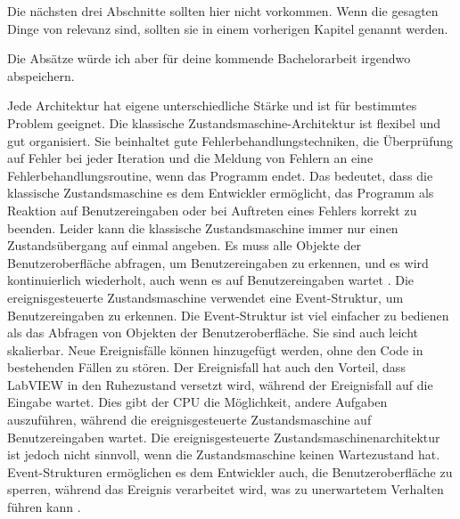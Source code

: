 \iffalse
Die nächsten drei Abschnitte sollten hier nicht vorkommen. Wenn die gesagten Dinge von relevanz sind, sollten sie in einem vorherigen Kapitel genannt werden. 

Die Absätze würde ich aber für deine kommende Bachelorarbeit irgendwo abspeichern.

Jede Architektur hat eigene unterschiedliche Stärke und ist für bestimmtes Problem geeignet. Die klassische Zustandsmaschine-Architektur ist flexibel und gut organisiert. Sie beinhaltet gute Fehlerbehandlungstechniken, die Überprüfung auf Fehler bei jeder Iteration und die Meldung von Fehlern an eine Fehlerbehandlungsroutine, wenn das Programm endet. Das bedeutet, dass die klassische Zustandsmaschine es dem Entwickler ermöglicht, das Programm als Reaktion auf Benutzereingaben oder bei Auftreten eines Fehlers korrekt zu beenden. Leider kann die klassische Zustandsmaschine immer nur einen Zustandsübergang auf einmal angeben. Es muss alle Objekte der Benutzeroberfläche abfragen, um Benutzereingaben zu erkennen, und es wird kontinuierlich wiederholt, auch wenn es auf Benutzereingaben wartet \citep[Kapitel 31.1]{Bress_Effective_Labview_programming_2013}. Die ereignisgesteuerte Zustandsmaschine verwendet eine Event-Struktur, um Benutzereingaben zu erkennen. Die Event-Struktur ist viel einfacher zu bedienen als das Abfragen von Objekten der Benutzeroberfläche. Sie sind auch leicht skalierbar. Neue Ereignisfälle können hinzugefügt werden, ohne den Code in bestehenden Fällen zu stören. Der Ereignisfall hat auch den Vorteil, dass LabVIEW in den Ruhezustand versetzt wird, während der Ereignisfall auf die Eingabe wartet. Dies gibt der CPU die Möglichkeit, andere Aufgaben auszuführen, während die ereignisgesteuerte Zustandsmaschine auf Benutzereingaben wartet. Die ereignisgesteuerte Zustandsmaschinenarchitektur ist jedoch nicht sinnvoll, wenn die Zustandsmaschine keinen Wartezustand hat. Event-Strukturen ermöglichen es dem Entwickler auch, die Benutzeroberfläche zu sperren, während das Ereignis verarbeitet wird, was zu unerwartetem Verhalten führen kann \citep[Kapitel 31.2]{Bress_Effective_Labview_programming_2013}.

